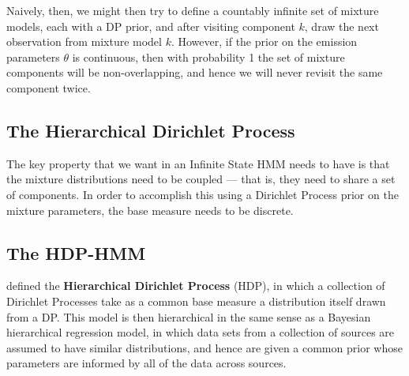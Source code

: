Naively, then, we might then try to define a countably infinite set of
mixture models, each with a DP prior, and after visiting component
$k$, draw the next observation from mixture model $k$.  However, if
the prior on the emission parameters $\theta$ is continuous, then with
probability 1 the set of mixture components will be non-overlapping,
and hence we will never revisit the same component twice.


\subsection{The Hierarchical Dirichlet Process}
\label{sec:hier-dirichl-proc}

The key property that we want in an Infinite State HMM needs to have
is that the mixture distributions need to be coupled --- that is, they
need to share a set of components.  In order to accomplish this using
a Dirichlet Process prior on the mixture parameters, the base measure
needs to be discrete.

\subsection{The HDP-HMM}
\label{sec:hdp-hmm}

\citet{teh2006hierarchical} defined the {\bf Hierarchical Dirichlet
  Process} (HDP), in which a collection of Dirichlet Processes take as
a common base measure a distribution itself drawn from a DP.  This
model is then hierarchical in the same sense as a Bayesian hierarchical regression
model, in which data sets from a collection of sources are assumed to
have similar distributions, and hence are given a common prior whose
parameters are informed by all of the data across sources.  

